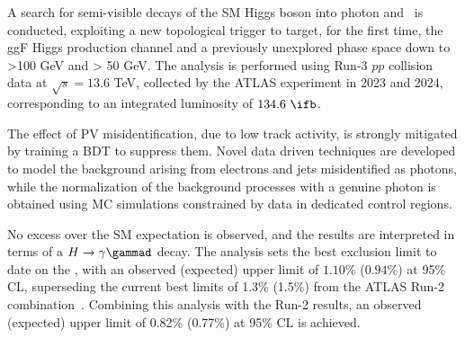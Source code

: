 A search for semi-visible decays of the SM Higgs boson into photon and \ETmiss\ is conducted, exploiting a new topological trigger to target, for the first time, the ggF Higgs production channel and a previously unexplored phase space down to \ETmiss>100 GeV and \pTy > 50 GeV. The analysis is performed using Run-3 $pp$ collision data at $\sqrt{s}=13.6$ TeV, collected by the ATLAS experiment in 2023 and 2024, corresponding to an integrated luminosity of $134.6~\ifb$. 

The effect of PV misidentification, due to low track activity, is strongly mitigated by training a BDT to suppress them. Novel data driven techniques are developed to model the background arising from electrons and jets misidentified as photons, while the normalization of the background processes with a genuine photon is obtained using MC simulations constrained by data in dedicated control regions.  

No excess over the SM expectation is observed, and the results are interpreted in terms of a $H\to\gamma\gammad$ decay. The analysis sets the best exclusion limit to date on the \br, with an observed (expected) upper limit  of $1.10\%$ ($0.94\%$) at 95\% CL, superseding the current best limits of 1.3\% (1.5\%) from the ATLAS Run-2 combination~\cite{ATLAS:2024cju}. Combining this analysis with the Run-2 results, an observed (expected) upper limit of 0.82\% (0.77\%) at 95\% CL is achieved.